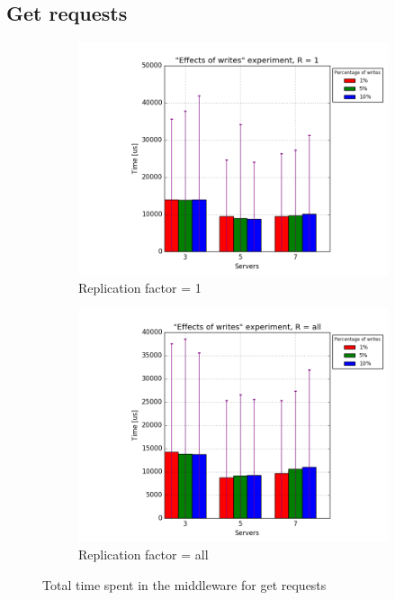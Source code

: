 \documentclass[11pt]{article}
\begin{document}
\subsection{Get requests}

\begin{figure}
\centering
\begin{subfigure}{.5\textwidth}
	\centering
	\includegraphics[width=\linewidth]{plots/writes-get-1-replication}
	\caption{Replication factor = 1}
	\label{fig:writes-get-1}
\end{subfigure}%
\begin{subfigure}{.5\textwidth}
	\centering
	\includegraphics[width=\linewidth]{plots/writes-get-2-replication}
	\caption{Replication factor = all}
	\label{fig:writes-get-2}
\end{subfigure}
\caption{Total time spent in the middleware for get requests}
\label{fig:writes-get}
\end{figure}
\end{document}
